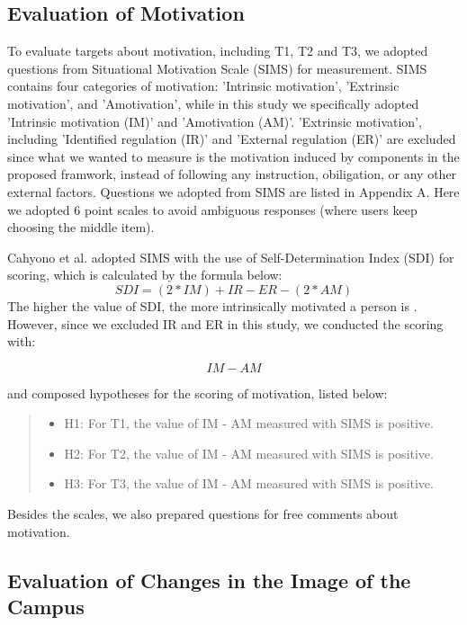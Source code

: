 \subsection{Evaluation of Motivation}

To evaluate targets about motivation, including T1, T2 and T3, we adopted questions from Situational Motivation Scale (SIMS) \cite{guay_vallerand_blanchard_2000} for measurement.
SIMS contains four categories of motivation: 'Intrinsic motivation', 'Extrinsic motivation', and 'Amotivation', while in this study we specifically adopted 'Intrinsic motivation (IM)' and 'Amotivation (AM)'.
'Extrinsic motivation', including 'Identified regulation (IR)' and 'External regulation (ER)' are excluded since what we wanted to measure is the motivation induced by components in the proposed framwork, instead of following any instruction, obiligation, or any other external factors.
Questions we adopted from SIMS are listed in Appendix A.
Here we adopted 6 point scales to avoid ambiguous responses (where users keep choosing the middle item).

Cahyono et al. adopted SIMS with the use of Self-Determination Index (SDI) for scoring, which is calculated by the formula below:
\[ SDI = (2 * IM) + IR - ER - (2 * AM) \]
The higher the value of SDI, the more intrinsically motivated a person is \cite{cahyono_ludwig_2017}.
However, since we excluded IR and ER in this study, we conducted the scoring with:

\[ IM - AM \]

and composed hypotheses for the scoring of motivation, listed below: 

\begin{quote}
  \begin{itemize}
    \item H1: For T1, the value of IM - AM measured with SIMS is positive.
    \item H2: For T2, the value of IM - AM measured with SIMS is positive.
    \item H3: For T3, the value of IM - AM measured with SIMS is positive.
  \end{itemize}
\end{quote}

Besides the scales, we also prepared questions for free comments about motivation.

\subsection{Evaluation of Changes in the Image of the Campus}

